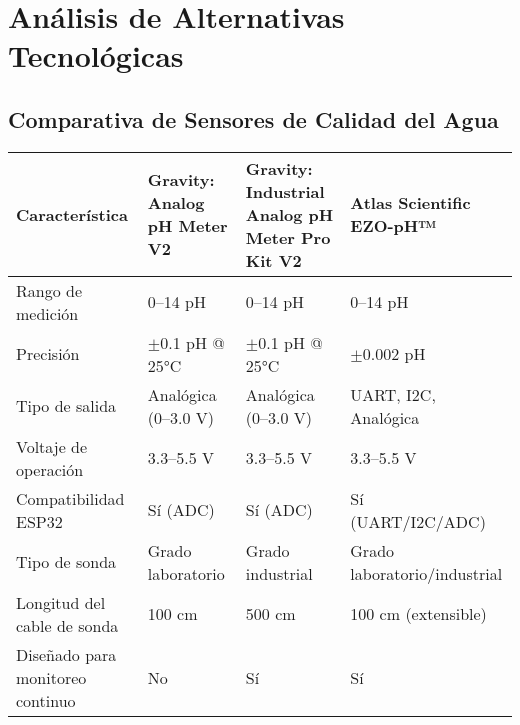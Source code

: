 \section{Análisis de Alternativas Tecnológicas}

\subsection{Comparativa de Sensores de Calidad del Agua}
\begin{table}[H]
    \centering
    \renewcommand{\arraystretch}{1.5}
    \begin{tabular}{
        |p{4cm}       
        |p{3cm}      
        |p{3cm}       
        |p{3cm}|      
    }
    \hline
    \textbf{Característica} 
        & \textbf{Gravity: Analog pH Meter V2} 
        & \textbf{Gravity: Industrial Analog pH Meter Pro Kit V2} 
        & \textbf{Atlas Scientific EZO-pH™} \\ 
    \hline
    
    Rango de medición 
        & 0--14 pH
        & 0--14 pH 
        & 0--14 pH \\ 
    \hline
    
    Precisión 
        & $\pm$0.1 pH @ 25°C 
        & $\pm$0.1 pH @ 25°C 
        & $\pm$0.002 pH \\ 
    \hline
    
    Tipo de salida 
        & Analógica (0--3.0 V) 
        & Analógica (0--3.0 V) 
        & UART, I2C, Analógica \\ 
    \hline
    
    Voltaje de operación 
        & 3.3--5.5 V 
        & 3.3--5.5 V 
        & 3.3--5.5 V \\ 
    \hline
    
    Compatibilidad ESP32 
        & Sí (ADC) 
        & Sí (ADC) 
        & Sí (UART/I2C/ADC) \\ 
    \hline
    
    Tipo de sonda 
        & Grado laboratorio 
        & Grado industrial 
        & Grado laboratorio/industrial \\ 
    \hline
    
    Longitud del cable de sonda 
        & 100 cm 
        & 500 cm 
        & 100 cm (extensible) \\ 
    \hline
    
    Diseñado para monitoreo continuo 
        & No 
        & Sí 
        & Sí \\ 
    \hline
    

\end{tabular}
\end{table}
